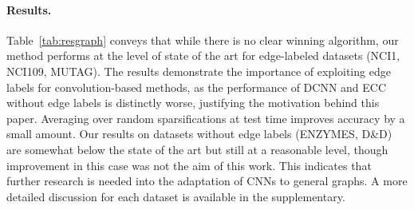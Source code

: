 \documentclass[10pt,twocolumn,letterpaper]{article}
\begin{document}
\paragraph*{Results.}
Table~\ref{tab:resgraph} conveys that while there is no clear winning algorithm, our method performs at the level of state of the art for edge-labeled datasets (NCI1, NCI109, MUTAG). The results demonstrate the importance of exploiting edge labels for convolution-based methods, as the performance of DCNN \cite{dcnn} and ECC without edge labels is distinctly worse, justifying the motivation behind this paper. Averaging over random sparsifications at test time improves accuracy by a small amount. Our results on datasets without edge labels (ENZYMES, D{\&}D) are somewhat below the state of the art but still at a reasonable level, though improvement in this case was not the aim of this work. This indicates that further research is needed into the adaptation of CNNs to general graphs. A more detailed discussion for each dataset is available in the supplementary.



\begin{table}[bt]
\centering
\addtolength{\tabcolsep}{-3pt}
\addtolength{\tabcolsep}{3pt}
\vspace{1.5ex}
\caption{\label{tab:stats}
Characteristics of the graph benchmark datasets, extended from \cite{struct2vec}. Both edge and vertex labels are categorical.}
\end{table}
\end{document}
